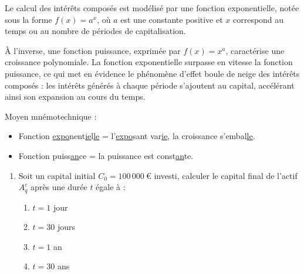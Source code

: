 \documentclass{article}
\begin{document}
\begin{enumerate}[label=\textbf{Q1.\arabic*}]
          \begin{tcolorbox}[
                  colback=lightgreen, 
                  colframe=lightgreen, 
                  boxrule=0.5pt, 
                  arc=0pt, 
                  left=10pt, 
                  right=10pt, 
                  top=6pt, 
                  bottom=6pt, 
                  boxsep=2pt, 
                  before upper={\faLightbulb\hspace{10pt}}
              ]
              Le calcul des intérêts composés est modélisé par une fonction exponentielle, notée sous la forme $f(x)=a^x$, où $a$ est une constante positive et $x$ correspond au temps ou au nombre de périodes de capitalisation.
              
              À l'inverse, une fonction puissance, exprimée par $f(x)=x^a$, caractérise une croissance polynomiale. La fonction exponentielle surpasse en vitesse la fonction puissance, ce qui met en évidence le phénomène d'effet boule de neige des intérêts composés : les intérêts générés à chaque période s'ajoutent au capital, accélérant ainsi son expansion au cours du temps.
              
              Moyen mnémotechnique : 
              \begin{itemize}
                  \item Fonction \underline{expo}nent\underline{ie}l\underline{le} = l'\underline{expo}sant var\underline{ie}, la croissance s'embal\underline{le}.
                  \item Fonction puiss\underline{an}ce = la puissance est const\underline{an}te.
              \end{itemize}
          \end{tcolorbox}
          
          \begin{enumerate}[label=\textbf{Q2.\arabic*}]
              \item Soit un capital initial \( C_0 = 100\,000\ \text{€} \) investi, calculer le capital final de l'actif \( A_q^c \) après une durée \( t \) égale à :
                    \begin{enumerate}[label=(\alph*)]
                        \item \( t = 1 \) jour
                        \item \( t = 30 \) jours
                        \item \( t = 1 \) an
                        \item \( t = 30 \) ans
                    \end{enumerate}
                        

\end{enumerate}
\end{enumerate}
\end{document}
